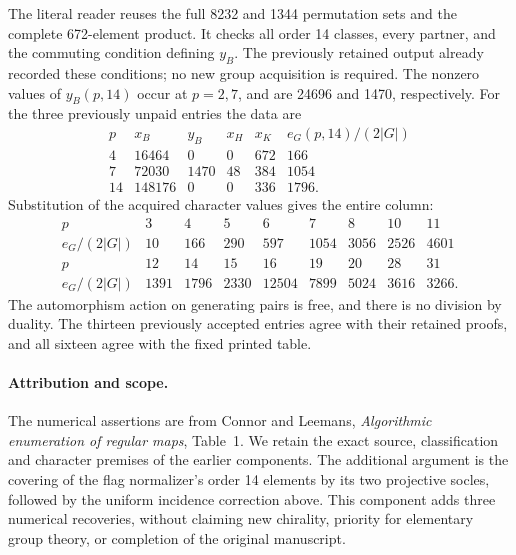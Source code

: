 \documentclass[11pt,a4paper]{article}
\begin{document}
The literal reader reuses the full 8232 and 1344 permutation sets
and the complete 672-element product. It checks all order 14
classes, every partner, and the commuting condition defining
$y_B$. The previously retained output already recorded these
conditions; no new group acquisition is required. The nonzero
values of $y_B(p,14)$ occur at $p=2,7$, and are 24696 and 1470,
respectively. For the three previously unpaid entries the data are
\[
\begin{array}{c|rrrr|r}
p&x_B&y_B&x_H&x_K&e_G(p,14)/(2|G|)\\\hline
4&16464&0&0&672&166\\
7&72030&1470&48&384&1054\\
14&148176&0&0&336&1796.
\end{array}
\]
Substitution of the acquired character values gives the entire column:
\[
\begin{array}{c|rrrrrrrr}
p&3&4&5&6&7&8&10&11\\\hline
e_G/(2|G|)&10&166&290&597&1054&3056&2526&4601\\[2pt]
p&12&14&15&16&19&20&28&31\\\hline
e_G/(2|G|)&1391&1796&2330&12504&7899&5024&3616&3266.
\end{array}
\]
The automorphism action on generating pairs is free, and there
is no division by duality. The thirteen previously accepted
entries agree with their retained proofs, and all sixteen agree
with the fixed printed table.

\paragraph{Attribution and scope.}
The numerical assertions are from Connor and Leemans,
\emph{Algorithmic enumeration of regular maps}, Table~1.
We retain the exact source, classification and character premises
of the earlier components. The additional argument is the covering
of the flag normalizer's order 14 elements by its two projective
socles, followed by the uniform incidence correction above.
This component adds three numerical recoveries, without claiming
new chirality, priority for elementary group theory, or completion
of the original manuscript.
\end{document}
